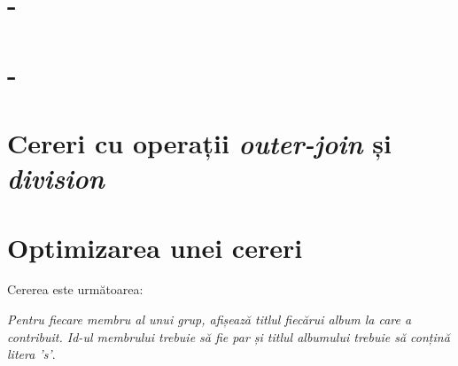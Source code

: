 \documentclass[a4paper, oneside, 12pt]{article}
\begin{document}
\begin{center}

\minipage{\linewidth}

\endminipage

\minipage{\linewidth}

\endminipage

\end{center}

\section{-}

\section{-}

\section{Cereri cu operații \emph{outer-join} și \emph{division}}

\begin{center}

\minipage{\linewidth}

\endminipage

\minipage{\linewidth}

\endminipage

\end{center}

\section{Optimizarea unei cereri}

Cererea este următoarea:
\begin{m_itemize}
        \item \emph{Pentru fiecare membru al unui grup, afișează titlul
              fiecărui album la care a contribuit. Id-ul membrului trebuie să
              fie par și titlul albumului trebuie să conțină litera 's'}.
\end{m_itemize}




\end{document}

